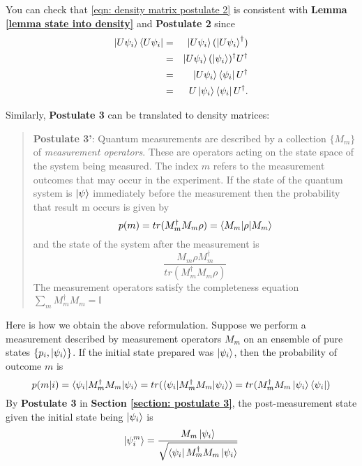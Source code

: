 You can check that \eqref{eqn: density matrix postulate 2} is consistent with \textbf{Lemma \ref{lemma state into density}} and {\bf{Postulate 2}} since
\begin{eqnarray}
\ket{U \psi_i}\bra{U \psi_i}&=& \ket{U \psi_i}(\ket{U \psi_i}^\dagger)\\
&=& \ket{U\psi_i}(\ket{\psi_i})^\dagger U^\dagger\\
&=& \ket{U \psi_i} \bra{\psi_i}U^\dagger\\
&=& U \ket{\psi_i}\bra{\psi_i}U^\dagger.
\end{eqnarray}

Similarly, \textbf{Postulate 3} can be translated to density matrices:
\begin{quote}
    \textbf{Postulate 3'}: Quantum measurements are described by a collection $\{M_m\}$ of \textit{measurement operators}. These are operators acting on the state space of the system being measured. The index $m$ refers to the measurement outcomes that may occur in the experiment. If the state of the quantum system is $\ket{\psi}$ immediately before the measurement then the probability that result m occurs is given by 
    \begin{equation} \label{eqn: general measurement probability density matrix}
        p(m)=tr(M_m^\dagger M_m \rho)=\braket{M_m| \rho |M_m}
    \end{equation}
    and the state of the system after the measurement is
    \begin{equation}
        \frac{M_m \rho M_m^\dagger}{tr(M_m^\dagger M_m \rho)}
    \end{equation}
    The measurement operators satisfy the completeness equation $\sum_m M_m^\dagger M_m =\mathbb{I}$
\end{quote}
Here is how we obtain the above reformulation. Suppose we perform a measurement described by measurement operators $M_m$ on an ensemble of pure states $\{p_i, \ket{\psi_i}\}$. If the initial state prepared was $\ket{\psi_i}$, then the probability of outcome $m$ is
    \begin{equation}
        p(m|i)=\braket{\psi_i|M_m^\dagger M_m|\psi_i}=tr(\braket{\psi_i|M_m^\dagger M_m|\psi_i})=tr(M_m^\dagger M_m \ket{\psi_i}\bra{\psi_i})
    \end{equation}
    By \textbf{Postulate 3} in \textbf{Section \ref{section: postulate 3}}, the post-measurement state given the initial state being $\ket{\psi_i}$ is
    \begin{equation}
        \ket{\psi_i^m}=\frac{M_m \ket{\psi_i}}{\sqrt{\bra{\psi_i}M_m^\dagger M_m \ket{\psi_i}}}
    \end{equation}
